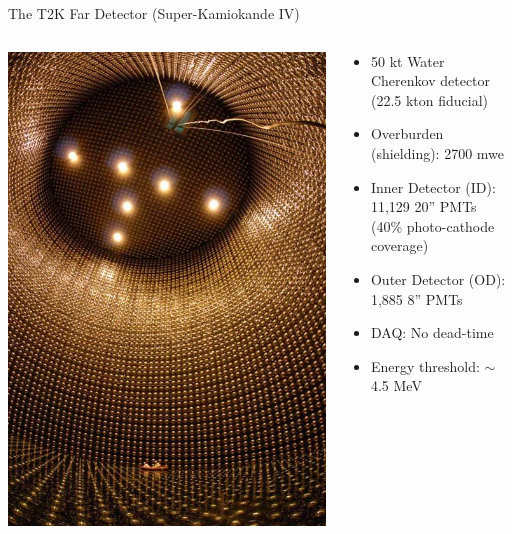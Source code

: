 %
%
%
\begin{frame}{The T2K Far Detector (Super-Kamiokande IV)}
\begin{columns}
  \begin{column}{0.45\textwidth}
     \includegraphics[height=0.85\textheight]{./images/3nu/accelerator/t2k/superk_inside_view_portrait_1.jpg}
  \end{column}
  \begin{column}{0.55\textwidth}
  {\small
  \begin{itemize}
    \item 50 kt Water Cherenkov detector\\ (22.5 kton fiducial)
    \item Overburden (shielding): 2700 mwe
    \item Inner Detector (ID): 11,129 20'' PMTs\\ (40\% photo-cathode coverage)
    \item Outer Detector (OD): 1,885 8'' PMTs
    \item DAQ: No dead-time
    \item Energy threshold: $\sim$ 4.5 MeV
  \end{itemize}
  }
  \end{column}
\end{columns}
\end{frame}

